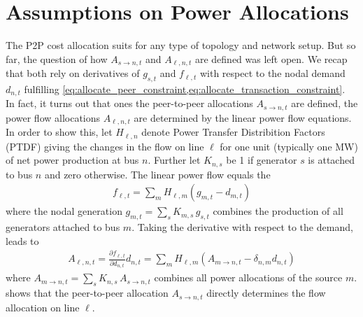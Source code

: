 \documentclass[11pt,twocolumn]{article}
\newcommand{\pdv}[2]{\frac{\partial #1}{\partial #2}}
\newcommand{\generation}{g_{s,t}}
\newcommand{\nodalgeneration}[1][n]{g_{#1,t}}
\newcommand{\demand}[1][n]{d_{#1,t}}
\newcommand{\incidenceGenerators}[1][n]{K_{#1,s}}
\newcommand{\ptdf}[1][n]{H_{\ell,#1}}
\newcommand{\slackk}[1][n]{k^*_{#1}}
\newcommand{\flow}{f_{\ell,t}}
\newcommand{\allocatePeer}[1][s \rightarrow n]{A_{#1,t}}
\newcommand{\allocateFlow}[1][n]{A_{\ell,#1,t}}
\begin{document}
\section{Assumptions on Power Allocations}
\label{sec:localizing_allocations}

The P2P cost allocation suits for any type of topology and network setup. But so far, the question of how $\allocatePeer$ and $\allocateFlow$ are defined was left open. We recap that both rely on derivatives of $\generation$ and $\flow$  with respect to the nodal demand $\demand$ fulfilling \cref{eq:allocate_peer_constraint,eq:allocate_transaction_constraint}. \\
% 
In fact, it turns out that ones the peer-to-peer allocations $\allocatePeer$ are defined, the power flow allocations $\allocateFlow$ are determined by the linear power flow equations.
In order to show this, let $\ptdf$ denote Power Transfer Distribition Factors (PTDF) giving the changes in the flow on line $\ell$ for one unit (typically one MW) of net power production at bus $n$.  Further let $\incidenceGenerators$ be 1 if generator $s$ is attached to bus $n$ and zero otherwise. The linear power flow equals the 
\begin{align}
 \flow  = \sum_m \ptdf[m] \left( \nodalgeneration[m] - \demand[m] \right)  
\end{align}
where the nodal generation $\nodalgeneration[m] = \sum_s \incidenceGenerators[m] \, \generation $ combines the production of all generators attached to bus $m$. Taking the derivative with respect to the demand, leads to 
\begin{align}
 \allocateFlow = \pdv{\flow}{\demand} \demand = \sum_m \ptdf[m] \left( \allocatePeer[m \rightarrow n]  - \delta_{n,m} \demand \right) 
 \label{eq:allocate_peer_to_allocate_flow}
\end{align}
where $\allocatePeer[m \rightarrow n] = \sum_s \incidenceGenerators \, \allocatePeer$ combines all power allocations of the source $m$.  shows that the peer-to-peer allocation $\allocatePeer$ directly determines the flow allocation on line $\ell$.
\end{document}
